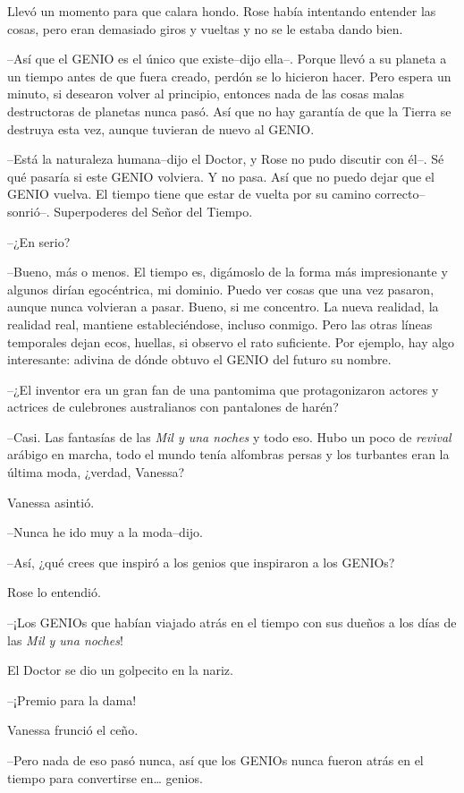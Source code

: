 Llevó un momento para que calara hondo. Rose había intentando entender
las cosas, pero eran demasiado giros y vueltas y no se le estaba dando
bien.

--Así que el GENIO es el único que existe--dijo ella--. Porque llevó a
su planeta a un tiempo antes de que fuera creado, perdón se lo hicieron
hacer. Pero espera un minuto, si desearon volver al principio, entonces
nada de las cosas malas destructoras de planetas nunca pasó. Así que no
hay garantía de que la Tierra se destruya esta vez, aunque tuvieran de
nuevo al GENIO.

--Está la naturaleza humana--dijo el Doctor, y Rose no pudo discutir con
él--. Sé qué pasaría si este GENIO volviera. Y no pasa. Así que no puedo
dejar que el GENIO vuelva. El tiempo tiene que estar de vuelta por su
camino correcto-- sonrió--. Superpoderes del Señor del Tiempo.

--¿En serio?

--Bueno, más o menos. El tiempo es, digámoslo de la forma más
impresionante y algunos dirían egocéntrica, mi dominio. Puedo ver cosas
que una vez pasaron, aunque nunca volvieran a pasar. Bueno, si me
concentro. La nueva realidad, la realidad real, mantiene
estableciéndose, incluso conmigo. Pero las otras líneas temporales dejan
ecos, huellas, si observo el rato suficiente. Por ejemplo, hay algo
interesante: adivina de dónde obtuvo el GENIO del futuro su nombre.

--¿El inventor era un gran fan de una pantomima que protagonizaron
actores y actrices de culebrones australianos con pantalones de harén?

--Casi. Las fantasías de las \emph{Mil y una noches} y todo eso. Hubo un
poco de \emph{revival} arábigo en marcha, todo el mundo tenía alfombras
persas y los turbantes eran la última moda, ¿verdad, Vanessa?

Vanessa asintió.

--Nunca he ido muy a la moda--dijo.

--Así, ¿qué crees que inspiró a los genios que inspiraron a los GENIOs?

Rose lo entendió.

--¡Los GENIOs que habían viajado atrás en el tiempo con sus dueños a los
días de las \emph{Mil y una noches}!

El Doctor se dio un golpecito en la nariz.

--¡Premio para la dama!

Vanessa frunció el ceño.

--Pero nada de eso pasó nunca, así que los GENIOs nunca fueron atrás en
el tiempo para convertirse en\ldots{} genios.

